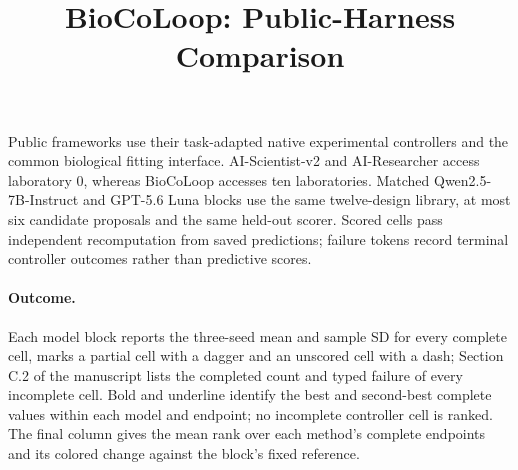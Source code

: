 \documentclass{article}
\title{BioCoLoop: Public-Harness Comparison}
\author{}
\date{}
\begin{document}
\maketitle
\noindent Public frameworks use their task-adapted native experimental controllers and the common biological fitting interface. AI-Scientist-v2 and AI-Researcher access laboratory 0, whereas BioCoLoop accesses ten laboratories. Matched Qwen2.5-7B-Instruct and GPT-5.6 Luna blocks use the same twelve-design library, at most six candidate proposals and the same held-out scorer. Scored cells pass independent recomputation from saved predictions; failure tokens record terminal controller outcomes rather than predictive scores.

\let\originaltable\table
\let\endoriginaltable\endtable
\renewenvironment{table}[1][]{\originaltable[H]}{\endoriginaltable}


\paragraph{Outcome.} Each model block reports the three-seed mean and sample SD for every complete cell, marks a partial cell with a dagger and an unscored cell with a dash; Section C.2 of the manuscript lists the completed count and typed failure of every incomplete cell. Bold and underline identify the best and second-best complete values within each model and endpoint; no incomplete controller cell is ranked. The final column gives the mean rank over each method's complete endpoints and its colored change against the block's fixed reference.
\end{document}
